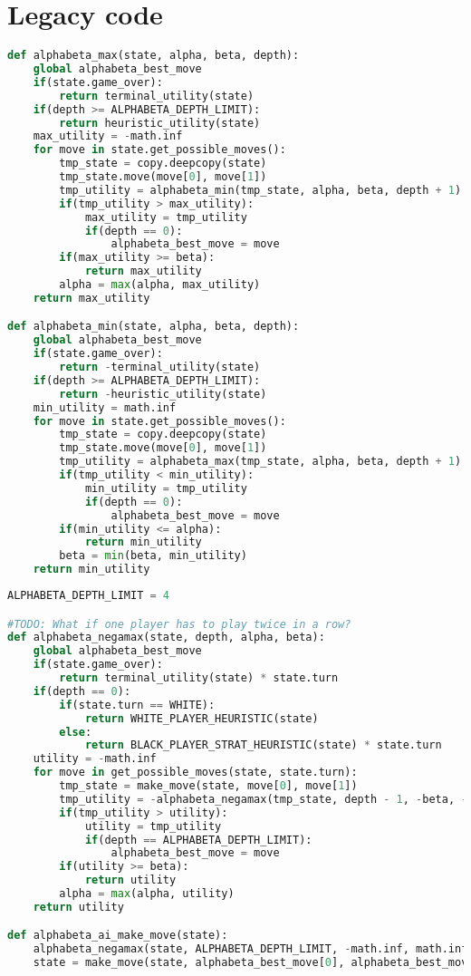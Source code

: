 \hypertarget{legacy-code}{%
\section{Legacy code}\label{legacy-code}}

\begin{lstlisting}[language=Python]
def alphabeta_max(state, alpha, beta, depth):
    global alphabeta_best_move
    if(state.game_over):
        return terminal_utility(state)
    if(depth >= ALPHABETA_DEPTH_LIMIT):
        return heuristic_utility(state)
    max_utility = -math.inf
    for move in state.get_possible_moves():
        tmp_state = copy.deepcopy(state)
        tmp_state.move(move[0], move[1])
        tmp_utility = alphabeta_min(tmp_state, alpha, beta, depth + 1)
        if(tmp_utility > max_utility):
            max_utility = tmp_utility
            if(depth == 0):
                alphabeta_best_move = move
        if(max_utility >= beta):
            return max_utility
        alpha = max(alpha, max_utility)
    return max_utility

def alphabeta_min(state, alpha, beta, depth):
    global alphabeta_best_move
    if(state.game_over):
        return -terminal_utility(state)
    if(depth >= ALPHABETA_DEPTH_LIMIT):
        return -heuristic_utility(state)
    min_utility = math.inf
    for move in state.get_possible_moves():
        tmp_state = copy.deepcopy(state)
        tmp_state.move(move[0], move[1])
        tmp_utility = alphabeta_max(tmp_state, alpha, beta, depth + 1)
        if(tmp_utility < min_utility):
            min_utility = tmp_utility
            if(depth == 0):
                alphabeta_best_move = move
        if(min_utility <= alpha):
            return min_utility
        beta = min(beta, min_utility)
    return min_utility
\end{lstlisting}

\begin{lstlisting}[language=Python]
ALPHABETA_DEPTH_LIMIT = 4

#TODO: What if one player has to play twice in a row?
def alphabeta_negamax(state, depth, alpha, beta):
    global alphabeta_best_move
    if(state.game_over):
        return terminal_utility(state) * state.turn
    if(depth == 0):
        if(state.turn == WHITE):
            return WHITE_PLAYER_HEURISTIC(state)
        else:
            return BLACK_PLAYER_STRAT_HEURISTIC(state) * state.turn
    utility = -math.inf
    for move in get_possible_moves(state, state.turn):
        tmp_state = make_move(state, move[0], move[1])
        tmp_utility = -alphabeta_negamax(tmp_state, depth - 1, -beta, -alpha)
        if(tmp_utility > utility):
            utility = tmp_utility
            if(depth == ALPHABETA_DEPTH_LIMIT):
                alphabeta_best_move = move
        if(utility >= beta):
            return utility
        alpha = max(alpha, utility)
    return utility

def alphabeta_ai_make_move(state):
    alphabeta_negamax(state, ALPHABETA_DEPTH_LIMIT, -math.inf, math.inf)
    state = make_move(state, alphabeta_best_move[0], alphabeta_best_move[1])
\end{lstlisting}

